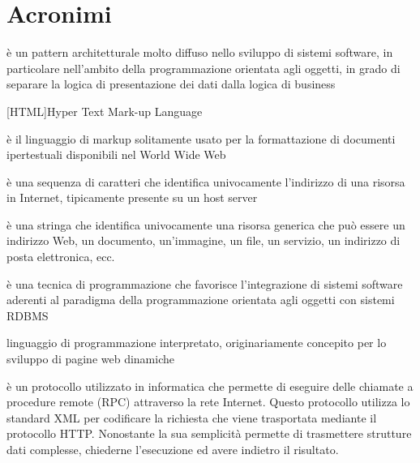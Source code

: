 \chapter{Acronimi} 
\begin{acronym} 

{\small è un pattern architetturale molto diffuso nello sviluppo di sistemi software, in particolare nell'ambito della programmazione orientata agli oggetti, in grado di separare la logica di presentazione dei dati dalla logica di business \par}
%
[HTML]{Hyper Text Mark-up Language}

{\small è il linguaggio di markup solitamente usato per la formattazione di documenti ipertestuali disponibili nel World Wide Web \par}
%

{\small è una sequenza di caratteri che identifica univocamente l'indirizzo di una risorsa in Internet, tipicamente presente su un host server \par}
%

{\small è una stringa che identifica univocamente una risorsa generica che può essere un indirizzo Web, un documento, un'immagine, un file, un servizio, un indirizzo di posta elettronica, ecc. \par}
%

{\small è una tecnica di programmazione che favorisce l'integrazione di sistemi software aderenti al paradigma della programmazione orientata agli oggetti con sistemi RDBMS \par}
%

{\small linguaggio di programmazione interpretato, originariamente concepito per lo sviluppo di pagine web dinamiche \par}
%

{\small è un protocollo utilizzato in informatica che permette di eseguire delle chiamate a procedure remote (RPC) attraverso la rete Internet. Questo protocollo utilizza lo standard XML per codificare la richiesta che viene trasportata mediante il protocollo HTTP. Nonostante la sua semplicità permette di trasmettere strutture dati complesse, chiederne l'esecuzione ed avere indietro il risultato. \par}
%


\end{acronym}
